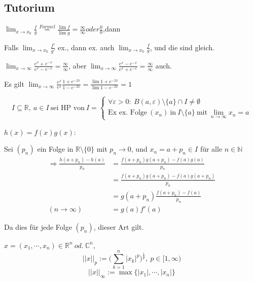 \newpage

\subsection{Tutorium}

$\lim_{x\rightarrow x_0}\frac{f}{g}\overset{Formel}{=}\frac{\lim f}{\lim g}=\frac{\infty}{\infty}oder\frac{0}{0}$,dann

Falls $\lim_{x\rightarrow x_0}\frac{f'}{g'}$ ex., dann ex. auch $\lim_{x\rightarrow x_0}\frac{f}{g}$, und die sind gleich.

\begin{exmp}
$\lim_{x\rightarrow\infty}\frac{e^x+e^{-x}}{e^x-e^{-x}}=\frac{\infty}{\infty}$, aber $\lim_{x\rightarrow\infty}\frac{e^x-e^{-x}}{e^x+e^{-x}}=\frac{\infty}{\infty}$ auch.

Es gilt $\lim_{x\rightarrow\infty}\frac{e^x}{e^x}\frac{1+e^{-2x}}{1-e^{-2x}}=\frac{\lim 1+e^{-2x}}{\lim 1-e^{-2x}}=1$
\end{exmp}

\begin{definition}[HP]
\begin{equation*}
I\subseteq\mathbb{R},\ a\in I\ \mbox{sei HP von}\ I=\left\{
\begin{array}{lcl}
\forall\varepsilon>0:\ B(a,\varepsilon)\setminus\{a\}\cap I\neq\emptyset\\
\mbox{Ex ex. Folge}\ (x_n)\ \mbox{in}\ I\setminus\{a\}\ \mbox{mit}\ \lim_{n\rightarrow\infty}x_n=a
\end{array}
\right.
\end{equation*}
\end{definition}

$h(x)=f(x)g(x)$:

Sei $(p_n)$ ein Folge in $\mathbb{R}\setminus\{0\}$  mit $p_n\rightarrow0$, und $x_n=a+p_n\in I$ für alle $n\in\mathbb{N}$
\begin{align*}
\Rightarrow\frac{h(a+p_n)-h(a)}{p_n}&=\frac{f(a+p_n)g(a+p_n)-f(a)g(a)}{p_n}\\
&=\frac{f(a+p_n)g(a+p_n)-f(a)g(a+p_n)}{p_n}\\
&=g(a+p_n)\frac{f(a+p_n)-f(a)}{p_n}\\
(n\rightarrow\infty)&=g(a)f'(a)
\end{align*}

Da dies für jede Folge $(p_n)$, dieser Art gilt.\\

\begin{definition}[Norm]
$x=(x_1,\cdots,x_n)\in\mathbb{R}^n\ od.\ \mathbb{C}^n$,
\begin{equation*}
||x||_p:=\bigg(\sum_{k=1}^n|x_k|^p\bigg)^{\frac{1}{p}},\ p\in[1,\infty)
\end{equation*}
\begin{equation*}
||x||_\infty:=\max\{|x_1|,\cdots,|x_n|\}
\end{equation*}
\end{definition}

